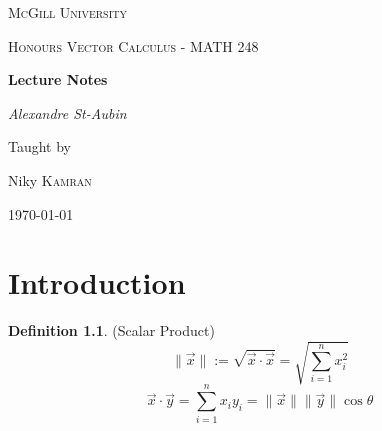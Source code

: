 \documentclass[12pt]{book}
\theoremstyle{definition}
\newtheorem{definition}{Definition}[section]
\theoremstyle{remark}
\begin{document}
\begin{titlepage}
	\centering
	{\scshape McGill University \par}
	\vspace{1cm}
	{\scshape\Large Honours Vector Calculus - MATH 248\par}
	\vspace{1.5cm}
	{\huge\bfseries Lecture Notes\par}
	\vspace{2cm}
	{\Large\itshape Alexandre St-Aubin\par}
	\vfill
	Taught by \par
	Niky \textsc{Kamran}

	\vfill

	{\large \today\par}
\end{titlepage}

\tableofcontents
\chapter{Introduction}

\begin{definition}(Scalar Product)
  $$
    \| \overrightarrow{x} \| := \sqrt{ \overrightarrow{x} \cdot \overrightarrow{x}} = \sqrt{\sum^n_{i =1} x_i^2} 
  $$
  $$ \overrightarrow{x} \cdot \overrightarrow{y} = \sum^n_{i=1} x_i y_i = \|\overrightarrow {x}\| \| \overrightarrow{y}\| \cos \theta$$ 
\end{definition} 
\end{document}
